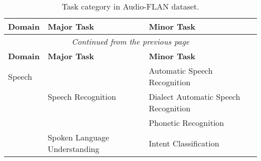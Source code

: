


\begin{longtable}{p{1.5cm}p{6cm}p{7cm}}   %
\caption{Task category in Audio-FLAN dataset.}  %
\label{tab:major_minor_task}  %
\\  %
\hline
\textbf{Domain} &  \textbf{Major Task} & \textbf{Minor Task}  \\
\hline
\endfirsthead  %
\multicolumn{3}{|c|}{\textit{Continued from the previous page}} \\  %
\hline
\textbf{Domain} &  \textbf{Major Task} & \textbf{Minor Task} \\
\hline
\endhead  %
\hline
\endfoot  %
\hline
\endlastfoot  %
    Speech & \multirow{3}{*}{Speech Recognition} & Automatic Speech Recognition          \\  %
                             \multirow{33}{*}{} &                      & Dialect Automatic Speech Recognition                 \\  %
                             &                      & Phonetic Recognition                                 \\  %
                             \cline{2-3} %
                            & \multirow{2}{*}{Spoken Language Understanding} & Intent Classification          \\  %

\end{longtable}
